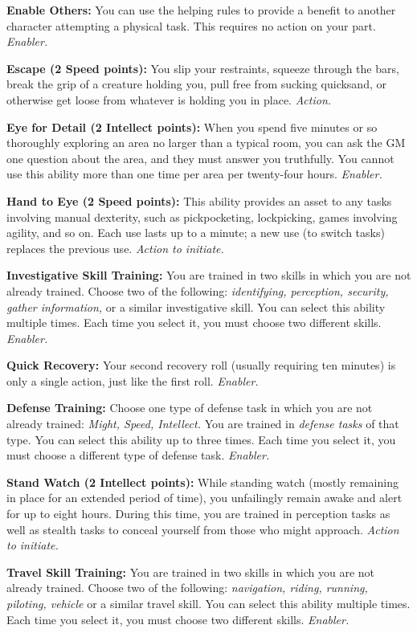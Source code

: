 \documentclass[a4paper,10pt,final,twocolumn,oneside]{book}
\newcommand{\itemAbility}[2]{\textcolor{25gray}{\textbullet\textbf{ #1:}}{ #2}\par}
\newcommand{\enabler}{\textit{ Enabler.}}
\newcommand{\action}{\textit{ Action.}}
\newcommand{\actionInit}{\textit{ Action to initiate.}}
\begin{document}
\itemAbility{Enable Others}{You can use the helping rules to provide a benefit to another character attempting a physical task. This requires no action on your part.\enabler}

\itemAbility{Escape (2 Speed points)}{You slip your restraints, squeeze through the bars, break the grip of a creature holding you, pull free from sucking quicksand, or otherwise get loose from whatever is holding you in place.\action}

\itemAbility{Eye for Detail (2 Intellect points)}{When you spend five minutes or so thoroughly exploring an area no larger than a typical room, you can ask the GM one question about the area, and they must answer you truthfully. You cannot use this ability more than one time per area per twenty-four hours.\enabler}

\itemAbility{Hand to Eye (2 Speed points)}{This ability provides an asset to any tasks involving manual dexterity, such as pickpocketing, lockpicking, games involving agility, and so on. Each use lasts up to a minute; a new use (to switch tasks) replaces the previous use.\actionInit}

\itemAbility{Investigative Skill Training}{You are trained in two skills in which you are not already trained. Choose two of the following: \textit{identifying, perception, security, gather information,} or a similar investigative skill. You can select this ability multiple times. Each time you select it, you must choose two different skills.\enabler}

\itemAbility{Quick Recovery}{Your second recovery roll (usually requiring ten minutes) is only a single action, just like the first roll.\enabler}

\itemAbility{Defense Training}{Choose one type of defense task in which you are not already trained: \textit{Might, Speed, Intellect.} You are trained in \emph{defense tasks} of that type. You can select this ability up to three times. Each time you select it, you must choose a different type of defense task.\enabler}

\itemAbility{Stand Watch (2 Intellect points)}{While standing watch (mostly remaining in place for an extended period of time), you unfailingly remain awake and alert for up to eight hours. During this time, you are trained in perception tasks as well as stealth tasks to conceal yourself from those who might approach.\actionInit}

\itemAbility{Travel Skill Training}{You are trained in two skills in which you are not already trained. Choose two of the following: \textit{navigation, riding, running, piloting, vehicle} or a similar travel skill. You can select this ability multiple times. Each time you select it, you must choose two different skills.\enabler}
\end{document}
